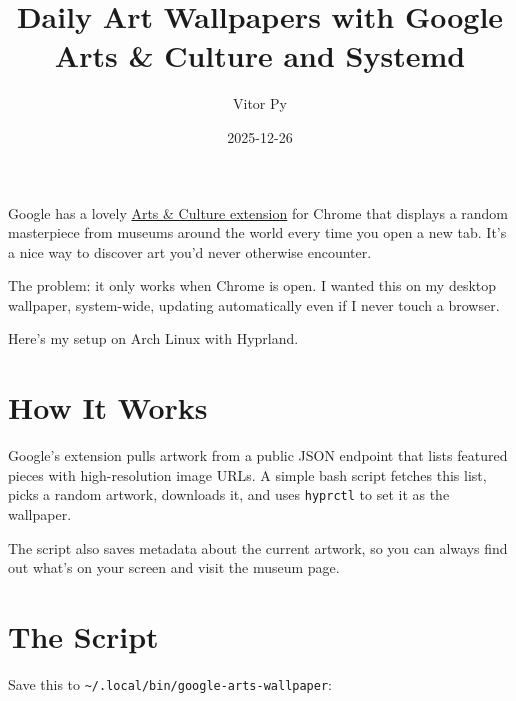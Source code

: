 \documentclass{article}
\title{Daily Art Wallpapers with Google Arts \& Culture and Systemd}
\author{Vitor Py}
\date{2025-12-26}
\begin{document}

\maketitle

Google has a lovely \href{https://chromewebstore.google.com/detail/google-arts-culture/akimgimeeoiognljlfchpbkpfbmeapkh}{Arts \& Culture extension} for Chrome that displays a random masterpiece from museums around the world every time you open a new tab. It's a nice way to discover art you'd never otherwise encounter.

The problem: it only works when Chrome is open. I wanted this on my desktop wallpaper, system-wide, updating automatically even if I never touch a browser.

Here's my setup on Arch Linux with Hyprland.


\section{How It Works}

Google's extension pulls artwork from a public JSON endpoint that lists featured pieces with high-resolution image URLs. A simple bash script fetches this list, picks a random artwork, downloads it, and uses \texttt{hyprctl} to set it as the wallpaper.

The script also saves metadata about the current artwork, so you can always find out what's on your screen and visit the museum page.

\section{The Script}

Save this to \texttt{\textasciitilde{}/.local/bin/google-arts-wallpaper}:
\end{document}
